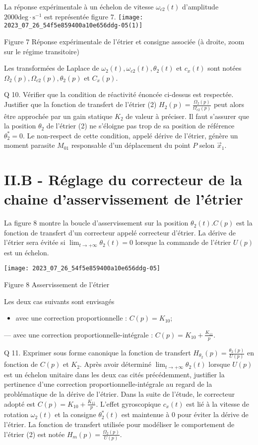La réponse expérimentale à un échelon de vitesse $\omega_{c 2}(t)$ d'amplitude $2000 \mathrm{deg} \cdot \mathrm{s}^{-1}$ est représentée figure 7.
\texttt{[image: 2023\_07\_26\_54f5e859400a10e656ddg-05(1)]}

Figure 7 Réponse expérimentale de l'étrier et consigne associée (à droite, zoom sur le régime transitoire)

Les transformées de Laplace de $\omega_{2}(t), \omega_{c 2}(t), \theta_{2}(t)$ et $c_{x}(t)$ sont notées $\Omega_{2}(p), \Omega_{c 2}(p), \theta_{2}(p)$ et $C_{x}(p)$.

Q 10. Vérifier que la condition de réactivité énoncée ci-dessus est respectée. Justifier que la fonction de transfert de l'étrier (2) $H_{2}(p)=\frac{\Omega_{2}(p)}{\Omega_{c 2}(p)}$ peut alors être approchée par un gain statique $K_{2}$ de valeur à préciser. Il faut s'assurer que la position $\theta_{2}$ de l'étrier (2) ne s'éloigne pas trop de sa position de référence $\theta_{2}^{*}=0$. Le non-respect de cette condition, appelé dérive de l'étrier, génère un moment parasite $M_{01}$ responsable d'un déplacement du point $P$ selon $\vec{x}_{1}$.

\section{II.B - Réglage du correcteur de la chaine d'asservissement de l'étrier}
La figure 8 montre la boucle d'asservissement sur la position $\theta_{2}(t) . C(p)$ est la fonction de transfert d'un correcteur appelé correcteur d'étrier. La dérive de l'étrier sera évitée si $\lim _{t \rightarrow+\infty} \theta_{2}(t)=0$ lorsque la commande de l'étrier $U(p)$ est un échelon.

\begin{center}
\texttt{[image: 2023\_07\_26\_54f5e859400a10e656ddg-05]}
\end{center}

Figure 8 Asservissement de l'étrier

Les deux cas suivants sont envisagés

\begin{itemize}
  \item avec une correction proportionnelle : $C(p)=K_{10}$;
\end{itemize}

— avec une correction proportionnelle-intégrale : $C(p)=K_{10}+\frac{K_{11}}{p}$.

Q 11. Exprimer sous forme canonique la fonction de transfert $H_{\theta_{2}}(p)=\frac{\theta_{2}(p)}{U(p)}$ en fonction de $C(p)$ et $K_{2}$. Après avoir déterminé $\lim _{t \rightarrow+\infty} \theta_{2}(t)$ lorsque $U(p)$ est un échelon unitaire dans les deux cas cités précédemment, justifier la pertinence d'une correction proportionnelle-intégrale au regard de la problématique de la dérive de l'étrier. Dans la suite de l'étude, le correcteur adopté est $C(p)=K_{10}+\frac{K_{11}}{p}$. L'effet gyroscopique $c_{x}(t)$ est lié à la vitesse de rotation $\omega_{2}(t)$ et la consigne $\theta_{2}^{*}(t)$ est maintenue à 0 pour éviter la dérive de l'étrier. La fonction de transfert utilisée pour modéliser le comportement de l'étrier (2) est notée $H_{m}(p)=\frac{\Omega_{2}(p)}{U(p)}$.

